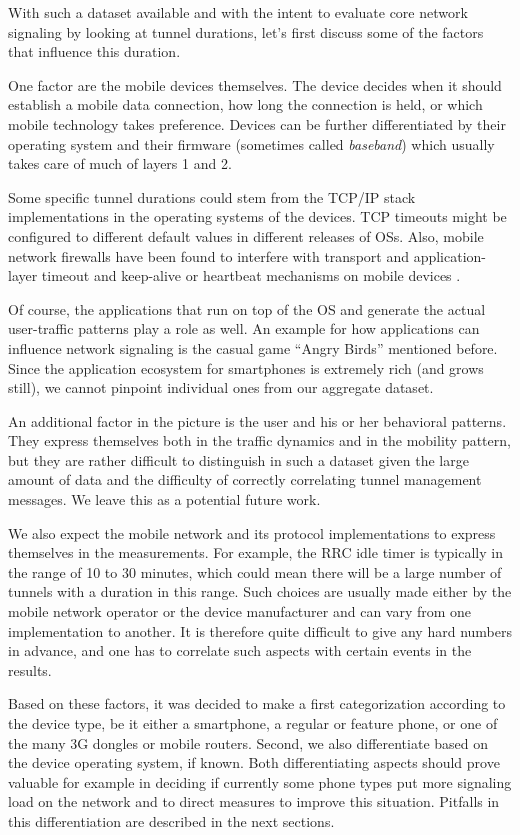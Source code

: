 With such a dataset available and with the intent to evaluate core network signaling by looking at tunnel durations, let's first discuss some of the factors that influence this duration.

One factor are the mobile devices themselves. The device decides when it should establish a mobile data connection, how long the connection is held, or which mobile technology takes preference. Devices can be further differentiated by their operating system and their firmware (sometimes called \textit{baseband}) which usually takes care of much of layers 1 and 2.

Some specific tunnel durations could stem from the TCP/IP stack implementations in the operating systems of the devices. TCP timeouts might be configured to different default values in different releases of OSs. Also, mobile network firewalls have been found to interfere with transport and application-layer timeout and keep-alive or heartbeat mechanisms on mobile devices \cite{sigcomm11middleboxes}.

Of course, the applications that run on top of the OS and generate the actual user-traffic patterns play a role as well. An example for how applications can influence network signaling is the casual game ``Angry Birds'' mentioned before. Since the application ecosystem for smartphones is extremely rich (and grows still), we cannot pinpoint individual ones from our aggregate dataset.

An additional factor in the picture is the user and his or her behavioral patterns. They express themselves both in the traffic dynamics and in the mobility pattern, but they are rather difficult to distinguish in such a dataset given the large amount of data and the difficulty of correctly correlating tunnel management messages. We leave this as a potential future work.

We also expect the mobile network and its protocol implementations to express themselves in the measurements. For example, the \gls{RRC} idle timer is typically in the range of 10 to 30 minutes, which could mean there will be a large number of tunnels with a duration in this range. Such choices are usually made either by the mobile network operator or the device manufacturer and can vary from one implementation to another. It is therefore quite difficult to give any hard numbers in advance, and one has to correlate such aspects with certain events in the results.

Based on these factors, it was decided to make a first categorization according to the device type, be it either a smartphone, a regular or feature phone, or one of the many 3G dongles or mobile routers. Second, we also differentiate based on the device operating system, if known. Both differentiating aspects should prove valuable for example in deciding if currently some phone types put more signaling load on the network and to direct measures to improve this situation. Pitfalls in this differentiation are described in the next sections.



